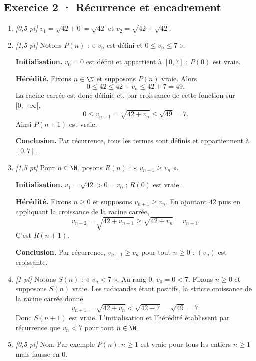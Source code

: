 \subsection*{Exercice 2 · Récurrence et encadrement}\begin{enumerate}

\item \textit{[0,5 pt]} $v_1=\sqrt{42+0}=\sqrt{42}$ et $v_2=\sqrt{42+\sqrt{42}}$.

\item \textit{[1,5 pt]} Notons $P(n)$ : « $v_n$ est défini et $0\le v_n\le 7$ ».
\par\smallskip\textbf{Initialisation.} $v_0=0$ est défini et appartient à $[0,7]$ ; $P(0)$ est vraie.
\par\smallskip\textbf{Hérédité.} Fixons $n\in\N$ et supposons $P(n)$ vraie. Alors
\[0\le 42\le 42+v_n\le 42+7=49.\]
La racine carrée est donc définie et, par croissance de cette fonction sur $[0,+\infty[$,
\[0\le v_{n+1}=\sqrt{42+v_n}\le\sqrt{49}=7.\]
Ainsi $P(n+1)$ est vraie.
\par\smallskip\textbf{Conclusion.} Par récurrence, tous les termes sont définis et appartiennent à $[0,7]$.

\item \textit{[1,5 pt]} Pour $n\in\N$, posons $R(n)$ : « $v_{n+1}\ge v_n$ ».
\par\smallskip\textbf{Initialisation.} $v_1=\sqrt{42}>0=v_0$ ; $R(0)$ est vraie.
\par\smallskip\textbf{Hérédité.} Fixons $n\ge0$ et supposons $v_{n+1}\ge v_n$. En ajoutant $42$ puis en appliquant la croissance de la racine carrée,
\[v_{n+2}=\sqrt{42+v_{n+1}}\ge\sqrt{42+v_n}=v_{n+1}.\]
C'est $R(n+1)$.
\par\smallskip\textbf{Conclusion.} Par récurrence, $v_{n+1}\ge v_n$ pour tout $n\ge0$ : $(v_n)$ est croissante.

\item \textit{[1 pt]} Notons $S(n)$ : « $v_n<7$ ». Au rang $0$, $v_0=0<7$.
Fixons $n\ge0$ et supposons $S(n)$ vraie. Les radicandes étant positifs, la stricte croissance de la racine carrée donne
\[v_{n+1}=\sqrt{42+v_n}<\sqrt{42+7}=\sqrt{49}=7.\]
Donc $S(n+1)$ est vraie. L'initialisation et l'hérédité établissent par récurrence que $v_n<7$ pour tout $n\in\N$.

\item \textit{[0,5 pt]} Non. Par exemple $P(n):n\ge1$ est vraie pour tous les entiers $n\ge1$ mais fausse en $0$.

\end{enumerate}

